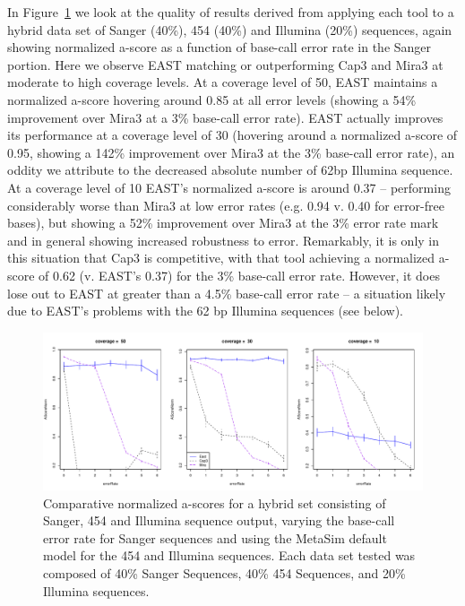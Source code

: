 \documentclass{bioinfo}
\newcommand{\capthree} {{\small Cap3}}
\newcommand{\east} {{\small EAST}}
\newcommand{\mira}{{\small Mira3}}
\begin{document}
 In Figure~\ref{hybridAscore} we look at the
quality of results derived from applying each tool to a hybrid data
set of Sanger (40\%), 454 (40\%) and Illumina (20\%) sequences, again
showing normalized a-score as a function of base-call error rate in
the Sanger portion.  Here we observe \east\/ matching or outperforming
\capthree\/ and \mira\/ at moderate to high coverage levels.  At a coverage
level of 50, \east\/ maintains a normalized a-score hovering around
0.85 at all error levels (showing a 54\% improvement over \mira\/ at a
3\% base-call error rate).  \east\/ actually improves its performance
at a coverage level of 30 (hovering around a normalized a-score of
0.95, showing a 142\% improvement over \mira\/ at the 3\% base-call
error rate), an oddity we attribute to the decreased absolute number
of 62bp Illumina sequence.  At a coverage level of 10 \east's
normalized a-score is around 0.37 -- performing considerably worse
than \mira\/ at low error rates (e.g. 0.94 v. 0.40 for error-free
bases), but showing a 52\% improvement over \mira\/ at the 3\% error
rate mark and in general showing increased robustness to error.
Remarkably, it is only in this situation that \capthree\/ is
competitive, with that tool achieving a normalized a-score of 0.62
(v. \east's 0.37) for the 3\% base-call error rate.  However, it does
lose out to \east\/ at greater than a 4.5\% base-call error rate -- a
situation likely due to \east's problems with the 62 bp Illumina
sequences (see below).

\begin{figure}[htb]
\centerline{\includegraphics[width=5in]{pics.d/ascore_hybrid.pdf}}
\caption{Comparative normalized a-scores for a hybrid set consisting
  of Sanger, 454 and Illumina sequence output, varying the base-call
  error rate for Sanger sequences and using the MetaSim default model
  for the 454 and Illumina sequences.  Each data set tested was
  composed of 40\% Sanger Sequences, 40\% 454 Sequences, and 20\%
  Illumina sequences.}
\label{hybridAscore}
\end{figure}
\end{document}
